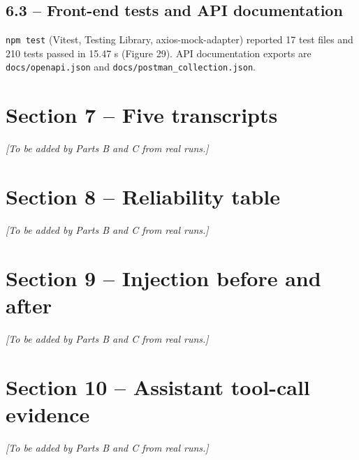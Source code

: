 \documentclass[11pt,letterpaper]{article}
\newcommand{\code}[1]{\texttt{#1}}
\begin{document}
\subsection*{6.3 -- Front-end tests and API documentation}

\code{npm test} (Vitest, Testing Library, axios-mock-adapter) reported 17 test files and 210 tests passed in 15.47 s (Figure 29). API documentation exports are \code{docs/\allowbreak{}openapi.\allowbreak{}json} and \code{docs/\allowbreak{}postman\_\allowbreak{}collection.\allowbreak{}json}.

\section*{Section 7 -- Five transcripts}

\textit{[To be added by Parts B and C from real runs.]}

\section*{Section 8 -- Reliability table}

\textit{[To be added by Parts B and C from real runs.]}

\section*{Section 9 -- Injection before and after}

\textit{[To be added by Parts B and C from real runs.]}

\section*{Section 10 -- Assistant tool-call evidence}

\textit{[To be added by Parts B and C from real runs.]}
\end{document}
